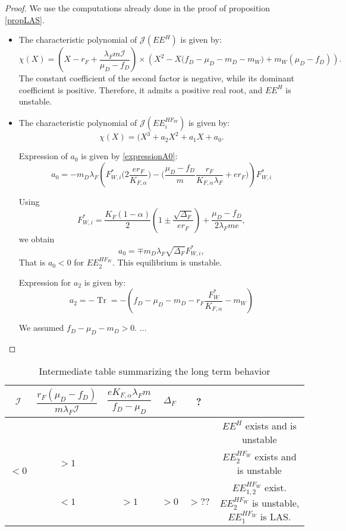 \documentclass{article}
\newcommand{\lfw}{\lambda_{F}}
\newcommand{\lfw}{\lambda_{F}}
\newcommand{\Kfa}{K_{F,\alpha}}
\newcommand{\cI}{\mathcal{I}}
\DeclareMathOperator{\Tr}{Tr}
\begin{document}
\begin{proof}
We use the computations already done in the proof of proposition \eqref{propLAS}. 
\begin{itemize}
\item The characteristic polynomial of $\mathcal{J}(EE^{H})$ is given by:
\begin{equation*}
\chi(X) = (X - r_F + \dfrac{\lfw m \cI}{\mu_D - f_D}) \times \left(X^2 - X\Big(f_D - \mu_D - m_D - m_W \Big) + m_W(\mu_D - f_D)\right).
\end{equation*}
The constant coefficient of the second factor is negative, while its dominant coefficient is positive. Therefore, it admits a positive real root, and $EE^{H}$ is unstable.

\item The characteristic polynomial of $\mathcal{J}(EE^{HF_W}_i)$ is given by:
\begin{equation*}
\chi(X) = (X^3 + a_2 X^2 + a_1 X + a_0.
\end{equation*}

Expression of $a_0$ is given by \eqref{expressionA0}:
\begin{equation*}
a_0 = - m_D \lfw \left( F_{W,i}^* \Big(2 \dfrac{e r_F}{K_{F, \alpha}} \Big) - \Big(\dfrac{\mu_D - f_D}{m} \dfrac{r_F}{K_{F, \alpha} \lfw} + er_F \Big) \right) F_{W,i}^*
\end{equation*}

Using
\begin{equation*}
F_{W, i}^* = \dfrac{K_F(1-\alpha)}{2}\left(1 \pm \dfrac{\sqrt{\Delta_F}}{er_F}\right) + \dfrac{\mu_D - f_D}{2\lfw m e},
\end{equation*}
we obtain
\begin{equation*}
a_0 = \mp m_D \lfw \sqrt{\Delta_F}  F^*_{W, i},
\end{equation*}
That is $a_0 < 0$ for $EE^{HF_W}_2$. This equilibrium is unstable.

Expression for $a_2$ is given by:
\begin{equation*}
a_2 = - \Tr = -(f_D - \mu_D - m_D - r_F \dfrac{F_W^*}{K_{F, \alpha}} - m_W)
\end{equation*}

We assumed $f_D - \mu_D - m_D > 0$. ...


\end{itemize}
\end{proof}


\begin{table}[ht!]
\def\arraystretch{2}
\centering
\begin{tabular}{c|c|c|c|c|c}
$\cI$ & $\dfrac{r_F(\mu_D-f_D)}{m\lfw \cI} $ &$\dfrac{e \Kfa \lfw m}{f_D - \mu_D}$ & $\Delta_{F}$ & ? &\\
\hline
\multirow{3}{*}{$ < 0$} &  & & & &$EE^{H}$ exists and is unstable \\
\cline{2-6}
 & $> 1$  &  & & &$EE^{HF_W}_2$ exists and is unstable\\
 \cline{2-6}
 & $< 1$& $>1$ & $ > 0$ & $>??$ & $EE^{HF_W}_{1,2}$ exist. $EE^{HF_W}_2$ is unstable, $EE^{HF_W}_1$ is LAS.  \\
\end{tabular}
\caption{Intermediate table summarizing the long term behavior}
\end{table}
\end{document}
